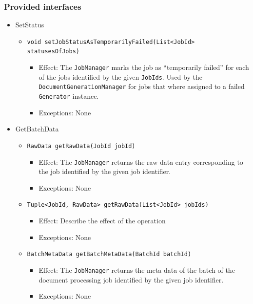 \documentclass[a4paper,10pt]{article}
\begin{document}
\subsubsection*{Provided interfaces}
\begin{itemize}
    \item SetStatus
    \begin{itemize}
        \item \texttt{void setJobStatusAsTemporarilyFailed(List<JobId> statusesOfJobs)}
        \begin{itemize}
            \item Effect: The \texttt{JobManager} marks the job as ``temporarily failed'' for each of the jobs identified by the given \texttt{JobIds}. Used by the \texttt{DocumentGenerationManager} for jobs that where assigned to a failed \texttt{Generator} instance.
            \item Exceptions: None
        \end{itemize}
    \end{itemize}
    
	\item GetBatchData
    \begin{itemize}
        \item \texttt{RawData getRawData(JobId jobId)}
        \begin{itemize}
            \item Effect: The \texttt{JobManager} returns the raw data entry corresponding to the job identified by the given job identifier.
            \item Exceptions: None
        \end{itemize}    
    
        \item \texttt{Tuple<JobId, RawData> getRawData(List<JobId> jobIds)}
        \begin{itemize}
            \item Effect: Describe the effect of the operation
            \item Exceptions: None
        \end{itemize}
        \item \texttt{BatchMetaData getBatchMetaData(BatchId batchId)}
        \begin{itemize}
            \item Effect: The \texttt{JobManager} returns the meta-data of the batch of the document processing job identified by the given job identifier.
            \item Exceptions: None
        \end{itemize}
    \end{itemize}    


\end{itemize}
\end{document}
